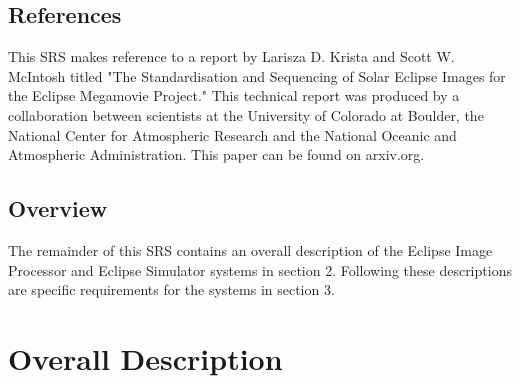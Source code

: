 \documentclass[10pt, onecolumn, draftclsnofoot, letterpaper, compsoc]{IEEEtran}
\begin{document}
\subsection{References}

This SRS makes reference to a report by Larisza D. Krista and Scott W.  
McIntosh titled "The Standardisation and Sequencing of Solar Eclipse Images for 
the Eclipse Megamovie Project." This technical report was produced by a 
collaboration between scientists at the University of Colorado at Boulder, the
 National Center for Atmospheric Research and the National Oceanic and 
 Atmospheric Administration. This paper can be found on arxiv.org.

\subsection{Overview}

The remainder of this SRS contains an overall description of the Eclipse Image
 Processor and Eclipse Simulator systems in section 2. Following these 
 descriptions are specific requirements for the systems in section 3.

\section{Overall Description}
\end{document}
